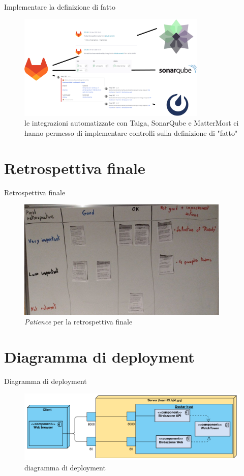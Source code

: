 \documentclass{beamer}
\begin{document}
\begin{frame}{Implementare la definizione di fatto}
	\begin{figure}
		\includegraphics[width=0.8\textwidth]{integrations}
		\caption{le integrazioni automatizzate con Taiga, SonarQube e MatterMost ci
			hanno permesso di implementare controlli sulla definizione di "fatto"}
	\end{figure}
\end{frame}

\section{Retrospettiva finale}
\begin{frame}{Retrospettiva finale}
	\begin{figure}
		\includegraphics[width=0.9\textwidth]{essence-final}
		\caption{\emph{Patience} per la retrospettiva finale}
	\end{figure}
\end{frame}

\section{Diagramma di deployment}
\begin{frame}{Diagramma di deployment}
	\begin{figure}
		\includegraphics[width=\textwidth]{deployment}
		\caption{diagramma di deployment}
	\end{figure}
\end{frame}
\end{document}
